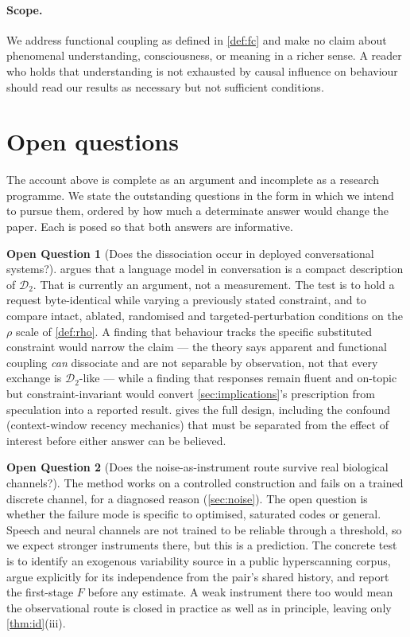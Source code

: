 \documentclass[11pt,a4paper]{article}
\theoremstyle{plain}
\theoremstyle{definition}
\newtheorem{question}{Open Question}
\theoremstyle{remark}
\newcommand{\Dy}{\mathcal{D}}
\begin{document}
\paragraph{Scope.}
We address functional coupling as defined in \cref{def:fc} and make no claim about phenomenal understanding,
consciousness, or meaning in a richer sense. A reader who holds that understanding is not exhausted by causal
influence on behaviour should read our results as necessary but not sufficient conditions.

\section{Open questions}\label{sec:open}

The account above is complete as an argument and incomplete as a research programme. We state the outstanding
questions in the form in which we intend to pursue them, ordered by how much a determinate answer would change
the paper. Each is posed so that both answers are informative.

\begin{question}[Does the dissociation occur in deployed conversational systems?]\label{q:humanai}
 argues that a language model in conversation is a compact description of $\Dy_2$. That is
currently an argument, not a measurement. The test is to hold a request byte-identical while varying a
previously stated constraint, and to compare intact, ablated, randomised and targeted-perturbation conditions on
the $\rho$ scale of \cref{def:rho}. A finding that behaviour tracks the specific substituted constraint would
narrow the claim --- the theory says apparent and functional coupling \emph{can} dissociate and are not
separable by observation, not that every exchange is $\Dy_2$-like --- while a finding that responses remain
fluent and on-topic but constraint-invariant would convert \cref{sec:implications}'s prescription from
speculation into a reported result.  gives the full design, including the confound
(context-window recency mechanics) that must be separated from the effect of interest before either answer can
be believed.
\end{question}

\begin{question}[Does the noise-as-instrument route survive real biological channels?]\label{q:hyper}
The method works on a controlled construction and fails on a trained discrete channel, for a diagnosed reason
(\cref{sec:noise}). The open question is whether the failure mode is specific to optimised, saturated codes or
general. Speech and neural channels are not trained to be reliable through a threshold, so we expect stronger
instruments there, but this is a prediction. The concrete test is to identify an exogenous variability source in
a public hyperscanning corpus, argue explicitly for its independence from the pair's shared history, and report
the first-stage $F$ before any estimate. A weak instrument there too would mean the observational route is closed
in practice as well as in principle, leaving only \cref{thm:id}(iii).
\end{question}
\end{document}
